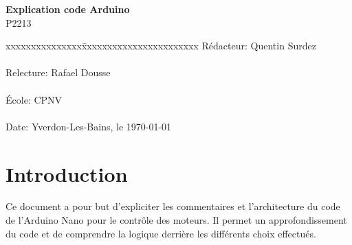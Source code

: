 \documentclass[
	a4paper,									%
	11pt,										%
	twoside,									%
	openright,									%
	notitlepage,									%
	parskip=half,								%
]{scrreprt}										%
\begin{document}
\begin{titlepage}
	\vspace{3cm}

	\fontsize{30pt}{32pt}\selectfont 
	\noindent \textbf{Explication code Arduino} \\

	\fontsize{18pt}{20pt}\selectfont\vspace{0.3em} P2213 \\

	\vspace{4cm}
	\fontsize{12pt}{15pt}\selectfont
	\begin{tabbing}
		xxxxxxxxxxxxxxx\=xxxxxxxxxxxxxxxxxxxxxxx \kill
		Rédacteur:\> Quentin Surdez\\ \\
		Relecture:\> Rafael Dousse\\ \\
		École:\> CPNV\\ \\
		Date:\> Yverdon-Les-Bains, le \today \\
	\end{tabbing}
\end{titlepage}

\tableofcontents

\listoffigures									%
\cleardoublepage

\setcounter{page}{1}

\chapter{Introduction}
Ce document a pour but d'expliciter les commentaires et l'architecture du code de l'Arduino Nano pour le contrôle des moteurs. Il permet un approfondissement du code et de comprendre la logique derrière 
les différents choix effectués.

\end{document}

